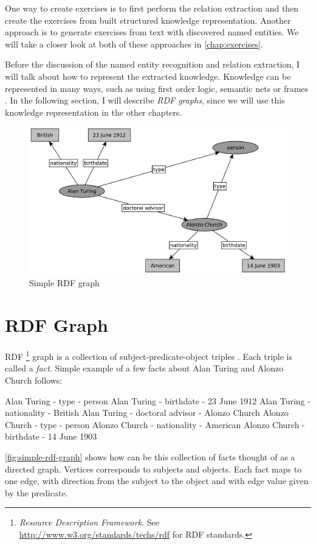 \documentclass[a4paper, 12pt, twoside]{fithesis2}		%
\renewcommand{\_}{\leavevmode \kern0.07em\vbox{\hrule width0.4em}}
\begin{document}
One way to create exercises is to first perform the relation extraction and then create the exercises from built structured knowledge representation. Another approach is to generate exercises from text with discovered named entities. We will take a closer look at both of these approaches in \autoref{chap:exercises}.

Before the discussion of the named entity recognition and relation extraction,
I will talk about how to represent the extracted knowledge.
Knowledge can be represented in many ways,
such as using first order logic, semantic nets or frames \cite{knowledge-representation}.
In the following section, I will describe \emph{RDF graphs},
since we will use this knowledge representation in the other chapters.

\begin{figure}[h]
  \centering
  \includegraphics[width=\textwidth]{images/rdf-graph.pdf}
  \caption{Simple RDF graph}
  \label{fig:simple-rdf-graph}
\end{figure}

\section{RDF Graph}
\label{sec:rdf-graph}


RDF%
\footnote{\textit{Resource Description Framework}.
See \url{http://www.w3.org/standards/techs/rdf} for RDF standards.}
graph is a collection of subject-predicate-object triples \parencite[][63]{semantic-web}.
Each triple is called a \textit{fact}.
Simple example of a few facts about Alan Turing and Alonzo Church follows:
\begin{code}
Alan Turing - type - person
Alan Turing - birthdate - 23 June 1912
Alan Turing - nationality - British
Alan Turing - doctoral advisor - Alonzo Church
Alonzo Church - type - person
Alonzo Church - nationality - American
Alonzo Church - birthdate - 14 June 1903
\end{code}
\noindent
\autoref{fig:simple-rdf-graph} shows how can be this collection of facts thought of as a directed graph.
Vertices corresponds to subjects and objects. Each fact maps to one edge, with direction from the subject to the object and with edge value given by the predicate.
\end{document}
